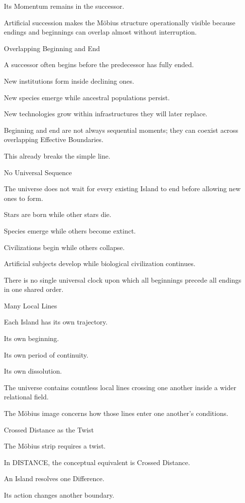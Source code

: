 Its Momentum remains in the successor.

Artificial succession makes the Möbius structure operationally visible because endings and beginnings can overlap almost without interruption.

Overlapping Beginning and End

A successor often begins before the predecessor has fully ended.

New institutions form inside declining ones.

New species emerge while ancestral populations persist.

New technologies grow within infrastructures they will later replace.

Beginning and end are not always sequential moments; they can coexist across overlapping Effective Boundaries.

This already breaks the simple line.

No Universal Sequence

The universe does not wait for every existing Island to end before allowing new ones to form.

Stars are born while other stars die.

Species emerge while others become extinct.

Civilizations begin while others collapse.

Artificial subjects develop while biological civilization continues.

There is no single universal clock upon which all beginnings precede all endings in one shared order.

Many Local Lines

Each Island has its own trajectory.

Its own beginning.

Its own period of continuity.

Its own dissolution.

The universe contains countless local lines crossing one another inside a wider relational field.

The Möbius image concerns how those lines enter one another’s conditions.

Crossed Distance as the Twist

The Möbius strip requires a twist.

In DISTANCE, the conceptual equivalent is Crossed Distance.

An Island resolves one Difference.

Its action changes another boundary.

